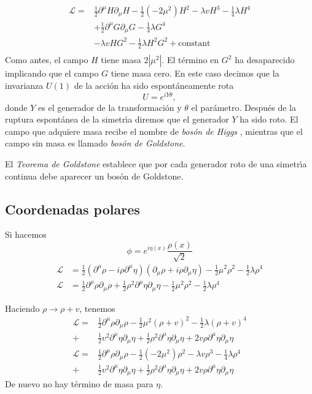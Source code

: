 \begin{align}
    \mathcal{L}=&\tfrac{1}{2}\partial^\mu H\partial_\mu H-\tfrac{1}{2}\left(-2\mu^2\right)H^2-\lambda vH^3-\tfrac{1}{4}\lambda H^4\nonumber\\
  &+\tfrac{1}{2}\partial^\mu G\partial_\mu G-\tfrac{1}{4}\lambda G^4\nonumber\\
  &-\lambda vHG^2-\tfrac{1}{2}\lambda H^2G^2+\text{constant}\nonumber\\
\end{align}
Como antes, el campo $H$ tiene masa $2|\mu^2|$. El t\'ermino en $G^2$ ha desaparecido implicando que el campo $G$ tiene masa cero.
En este caso decimos que la invarianza $U(1)$ de la acci\'on ha sido espont\'aneamente rota
\begin{equation}
  U=e^{iY\theta},
\end{equation}
donde $Y$ es el generador de la transformaci\'on y $\theta$ el par\'ametro. Despu\'es de la ruptura espont\'anea de la simetr\'\i a diremos que el generador $Y$ ha sido roto. El campo que adquiere masa recibe el nombre de \emph{bos\'on de Higgs} \cite{Higgs:1964pj}, mientras que el campo sin masa es llamado \emph{bos\'on de Goldstone}. 

El \emph{Teorema de Goldstone} establece que por cada generador roto de una simetr\'\i a continua debe aparecer un bos\'on de Goldstone.

\subsection{Coordenadas polares}

Si hacemos
\begin{equation}
  \phi=e^{i\eta(x)}\frac{\rho(x)}{\sqrt{2}}
\end{equation}
\begin{align}
  \mathcal{L}&=\tfrac{1}{2}\left(\partial^\mu\rho-i\rho\partial^\mu\eta\right)\left(\partial_\mu\rho+i\rho\partial_\mu\eta\right)-\tfrac{1}{2}\mu^2\rho^2-\tfrac{1}{2}\lambda\rho^4\nonumber\\
    \mathcal{L}&=\tfrac{1}{2}\partial^\mu\rho\partial_\mu\rho+\tfrac{1}{2}\rho^2\partial^\mu\eta\partial_\mu\eta-\tfrac{1}{2}\mu^2\rho^2-\tfrac{1}{2}\lambda\rho^4
\end{align}


Haciendo $\rho\to \rho+v$, tenemos
\begin{align}
  \mathcal{L}=&\tfrac{1}{2}\partial^\mu\rho\partial_\mu\rho-\tfrac{1}{2}\mu^2(\rho+v)^2-\tfrac{1}{2}\lambda(\rho+v)^4\nonumber\\
  +&\tfrac{1}{2}v^2\partial^\mu\eta\partial_\mu\eta+\tfrac{1}{2}\rho^2\partial^\mu\eta\partial_\mu\eta+2v\rho\partial^\mu\eta\partial_\mu\eta\nonumber\\
  \mathcal{L}=&\tfrac{1}{2}\partial^\mu\rho\partial_\mu\rho-\tfrac{1}{2}\left(-2\mu^2\right)\rho^2-\lambda v\rho^3-\tfrac{1}{4}\lambda \rho^4\nonumber\\
  +&\tfrac{1}{2}v^2\partial^\mu\eta\partial_\mu\eta+\tfrac{1}{2}\rho^2\partial^\mu\eta\partial_\mu\eta+2v\rho\partial^\mu\eta\partial_\mu\eta
\end{align}
De nuevo no hay t\'ermino de masa para $\eta$.


